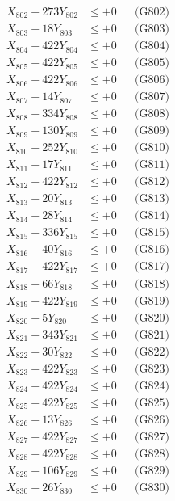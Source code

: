 \documentclass[a4paper,10pt]{article}
\begin{document}
{\begin{align}
X_{802} - 273Y_{802} &\leq +0 && \text{(G802)} \\
X_{803} - 18Y_{803} &\leq +0 && \text{(G803)} \\
X_{804} - 422Y_{804} &\leq +0 && \text{(G804)} \\
X_{805} - 422Y_{805} &\leq +0 && \text{(G805)} \\
X_{806} - 422Y_{806} &\leq +0 && \text{(G806)} \\
X_{807} - 14Y_{807} &\leq +0 && \text{(G807)} \\
X_{808} - 334Y_{808} &\leq +0 && \text{(G808)} \\
X_{809} - 130Y_{809} &\leq +0 && \text{(G809)} \\
X_{810} - 252Y_{810} &\leq +0 && \text{(G810)} \\
\allowbreak
X_{811} - 17Y_{811} &\leq +0 && \text{(G811)} \\
X_{812} - 422Y_{812} &\leq +0 && \text{(G812)} \\
X_{813} - 20Y_{813} &\leq +0 && \text{(G813)} \\
X_{814} - 28Y_{814} &\leq +0 && \text{(G814)} \\
X_{815} - 336Y_{815} &\leq +0 && \text{(G815)} \\
X_{816} - 40Y_{816} &\leq +0 && \text{(G816)} \\
X_{817} - 422Y_{817} &\leq +0 && \text{(G817)} \\
X_{818} - 66Y_{818} &\leq +0 && \text{(G818)} \\
X_{819} - 422Y_{819} &\leq +0 && \text{(G819)} \\
X_{820} - 5Y_{820} &\leq +0 && \text{(G820)} \\
\allowbreak
X_{821} - 343Y_{821} &\leq +0 && \text{(G821)} \\
X_{822} - 30Y_{822} &\leq +0 && \text{(G822)} \\
X_{823} - 422Y_{823} &\leq +0 && \text{(G823)} \\
X_{824} - 422Y_{824} &\leq +0 && \text{(G824)} \\
X_{825} - 422Y_{825} &\leq +0 && \text{(G825)} \\
X_{826} - 13Y_{826} &\leq +0 && \text{(G826)} \\
X_{827} - 422Y_{827} &\leq +0 && \text{(G827)} \\
X_{828} - 422Y_{828} &\leq +0 && \text{(G828)} \\
X_{829} - 106Y_{829} &\leq +0 && \text{(G829)} \\
X_{830} - 26Y_{830} &\leq +0 && \text{(G830)} \\

\end{align}}
\end{document}
